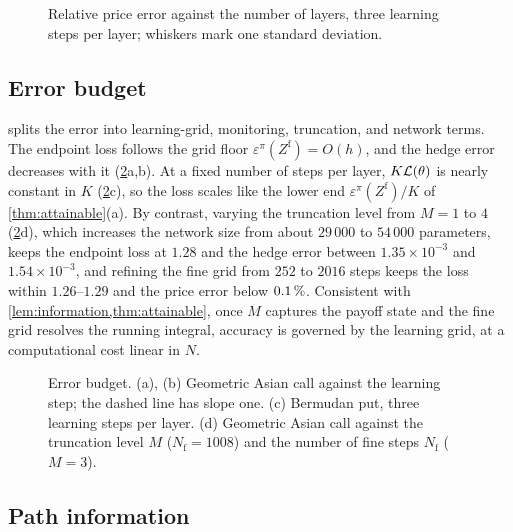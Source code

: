 \begin{figure}[htbp]
\centering
\resizebox{\textwidth}{!}{}
\caption{Relative price error against the number of layers, three learning steps per layer; whiskers mark one standard deviation.}
\label{fig:kscan}
\end{figure}

\subsection{Error budget}\label{sec:exp-budget}

 splits the error into learning-grid, monitoring, truncation, and network terms. The endpoint loss follows the grid floor $\varepsilon^\pi(Z^{\mathrm f})=O(h)$, and the hedge error decreases with it (\cref{fig:floor}a,b). At a fixed number of steps per layer, $K\mathcal{L}(\theta)$ is nearly constant in $K$ (\cref{fig:floor}c), so the loss scales like the lower end $\varepsilon^\pi(Z^{\mathrm f})/K$ of \cref{thm:attainable}(a). By contrast, varying the truncation level from $M=1$ to $4$ (\cref{fig:floor}d), which increases the network size from about $29\,000$ to $54\,000$ parameters, keeps the endpoint loss at $1.28$ and the hedge error between $1.35\times10^{-3}$ and $1.54\times10^{-3}$, and refining the fine grid from $252$ to $2016$ steps keeps the loss within $1.26$--$1.29$ and the price error below $0.1\,\%$. Consistent with \cref{lem:information,thm:attainable}, once $M$ captures the payoff state and the fine grid resolves the running integral, accuracy is governed by the learning grid, at a computational cost linear in $N$.

\begin{figure}[htbp]
\centering
\resizebox{\textwidth}{!}{}
\caption{Error budget. (a), (b) Geometric Asian call against the learning step; the dashed line has slope one. (c) Bermudan put, three learning steps per layer. (d) Geometric Asian call against the truncation level $M$ ($N_{\mathrm f}=1008$) and the number of fine steps $N_{\mathrm f}$ ($M=3$).}
\label{fig:floor}
\end{figure}

\subsection{Path information}\label{sec:exp-information}


